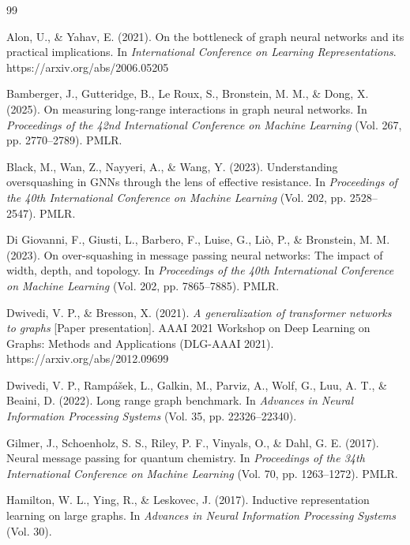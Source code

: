 \begin{thebibliography}{99}

Alon, U., \& Yahav, E. (2021). On the bottleneck of graph neural networks and its practical implications. In \emph{International Conference on Learning Representations}. https://arxiv.org/abs/2006.05205

Bamberger, J., Gutteridge, B., Le Roux, S., Bronstein, M. M., \& Dong, X. (2025). On measuring long-range interactions in graph neural networks. In \emph{Proceedings of the 42nd International Conference on Machine Learning} (Vol. 267, pp. 2770--2789). PMLR.

Black, M., Wan, Z., Nayyeri, A., \& Wang, Y. (2023). Understanding oversquashing in GNNs through the lens of effective resistance. In \emph{Proceedings of the 40th International Conference on Machine Learning} (Vol. 202, pp. 2528--2547). PMLR.

Di Giovanni, F., Giusti, L., Barbero, F., Luise, G., Li\`{o}, P., \& Bronstein, M. M. (2023). On over-squashing in message passing neural networks: The impact of width, depth, and topology. In \emph{Proceedings of the 40th International Conference on Machine Learning} (Vol. 202, pp. 7865--7885). PMLR.

Dwivedi, V. P., \& Bresson, X. (2021). \emph{A generalization of transformer networks to graphs} [Paper presentation]. AAAI 2021 Workshop on Deep Learning on Graphs: Methods and Applications (DLG-AAAI 2021). https://arxiv.org/abs/2012.09699

Dwivedi, V. P., Ramp\'{a}\v{s}ek, L., Galkin, M., Parviz, A., Wolf, G., Luu, A. T., \& Beaini, D. (2022). Long range graph benchmark. In \emph{Advances in Neural Information Processing Systems} (Vol. 35, pp. 22326--22340).

Gilmer, J., Schoenholz, S. S., Riley, P. F., Vinyals, O., \& Dahl, G. E. (2017). Neural message passing for quantum chemistry. In \emph{Proceedings of the 34th International Conference on Machine Learning} (Vol. 70, pp. 1263--1272). PMLR.

Hamilton, W. L., Ying, R., \& Leskovec, J. (2017). Inductive representation learning on large graphs. In \emph{Advances in Neural Information Processing Systems} (Vol. 30).


\end{thebibliography}
